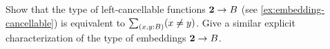 \documentclass[hott-all.tex]{subfiles}
\begin{document}
\begin{ex}\label{ex:cancellable-from-bool}
  Show that the type of left-cancellable functions $\mathbf{2}\to B$ (see \cref{ex:embedding-cancellable}) is equivalent to $\sm{x,y:B}(x\neq y)$.
  Give a similar explicit characterization of the type of embeddings $\mathbf{2}\to B$.
\end{ex}

\end{document}
